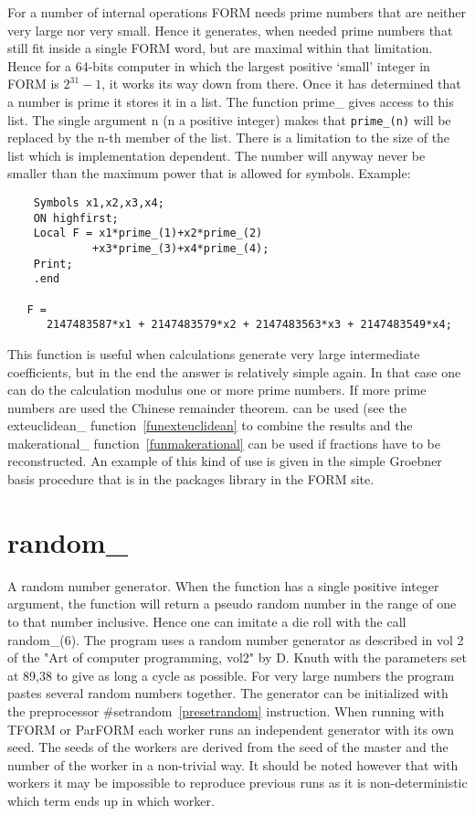 \noindent For a number of internal operations FORM needs prime numbers that 
are neither very large nor very small. Hence it generates, when needed 
prime numbers that still fit inside a single FORM word, but are maximal 
within that limitation. Hence for a 64-bits computer in which the largest 
positive `small' integer in FORM is $2^{31}-1$, it works its way down from 
there. Once it has determined that a number is prime it stores it in a 
list. The function prime\_ gives access to this list. The single argument 
n (n a positive integer) makes that \verb:prime_(n): will be replaced by 
the n-th member of the list. There is a limitation to the size of the list 
which is implementation dependent. The number will anyway never be smaller 
than the maximum power that is allowed for symbols. Example:
\begin{verbatim}
    Symbols x1,x2,x3,x4;
    ON highfirst;
    Local F = x1*prime_(1)+x2*prime_(2)
             +x3*prime_(3)+x4*prime_(4);
    Print;
    .end

   F =
      2147483587*x1 + 2147483579*x2 + 2147483563*x3 + 2147483549*x4;
\end{verbatim}
This function is useful when calculations generate very large intermediate 
coefficients, but in the end the answer is relatively simple again. In that 
case one can do the calculation modulus one or more prime numbers. If more 
prime numbers are used the Chinese remainder theorem. can be used (see the exteuclidean\_ 
function~\ref{funexteuclidean} to combine the results and the 
makerational\_ function~\ref{funmakerational} can be used if fractions have 
to be reconstructed. An example of this kind of use is given in the simple 
Groebner basis procedure that is in the packages library in the FORM site.


\section{random\_}
\label{funrandom}
\noindent A random number generator. When the function has a single 
positive integer argument, the function will return a pseudo random number 
in the range of one to that number inclusive. Hence one can imitate a die 
roll with the call random\_(6). The program uses a random number generator 
as described in vol 2 of the "Art of computer programming, vol2" by D. 
Knuth with the parameters set at 89,38 to give as long a cycle as possible. 
For very large numbers the program pastes several random numbers together. 
The generator can be initialized with the preprocessor 
\#setrandom~\ref{presetrandom} instruction. When running 
with TFORM or ParFORM each worker runs an independent generator with its 
own seed. The seeds of the workers are derived from the seed of the master 
and the number of the worker in a non-trivial way. It should be noted 
however that with workers it may be impossible to reproduce previous runs 
as it is non-deterministic which term ends up in which worker.

